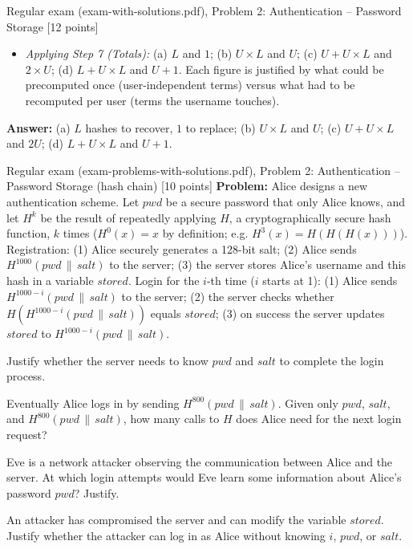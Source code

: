 \documentclass[12pt, a4paper]{article}
\begin{document}
\begin{practicebox}{Regular exam (exam-with-solutions.pdf), Problem 2: Authentication -- Password Storage [12 points]}
\begin{itemize}
    \item \textit{Applying Step 7 (Totals):} (a) $L$ and $1$; (b) $U \times L$ and $U$; (c) $U + U \times L$ and $2 \times U$; (d) $L + U \times L$ and $U + 1$. Each figure is justified by what could be precomputed once (user-independent terms) versus what had to be recomputed per user (terms the username touches).
\end{itemize}
\textbf{Answer:} (a) $L$ hashes to recover, $1$ to replace; (b) $U \times L$ and $U$; (c) $U + U \times L$ and $2U$; (d) $L + U \times L$ and $U + 1$.
\end{practicebox}

\begin{practicebox}{Regular exam (exam-problems-with-solutions.pdf), Problem 2: Authentication -- Password Storage (hash chain) [10 points]}
\textbf{Problem:} Alice designs a new authentication scheme. Let $pwd$ be a secure password that only Alice knows, and let $H^{k}$ be the result of repeatedly applying $H$, a cryptographically secure hash function, $k$ times ($H^{0}(x) = x$ by definition; e.g. $H^{3}(x) = H(H(H(x)))$). Registration: (1) Alice securely generates a 128-bit salt; (2) Alice sends $H^{1000}(pwd \,\|\, salt)$ to the server; (3) the server stores Alice's username and this hash in a variable $stored$. Login for the $i$-th time ($i$ starts at 1): (1) Alice sends $H^{1000-i}(pwd \,\|\, salt)$ to the server; (2) the server checks whether $H(H^{1000-i}(pwd \,\|\, salt))$ equals $stored$; (3) on success the server updates $stored$ to $H^{1000-i}(pwd \,\|\, salt)$.
\begin{tightitem}
\item[(a)] [2p] Justify whether the server needs to know $pwd$ and $salt$ to complete the login process.
\item[(b)] [2p] Eventually Alice logs in by sending $H^{800}(pwd \,\|\, salt)$. Given only $pwd$, $salt$, and $H^{800}(pwd \,\|\, salt)$, how many calls to $H$ does Alice need for the next login request?
\item[(c)] [3p] Eve is a network attacker observing the communication between Alice and the server. At which login attempts would Eve learn some information about Alice's password $pwd$? Justify.
\item[(d)] [3p] An attacker has compromised the server and can modify the variable $stored$. Justify whether the attacker can log in as Alice without knowing $i$, $pwd$, or $salt$.
\end{tightitem}


\end{practicebox}
\end{document}
